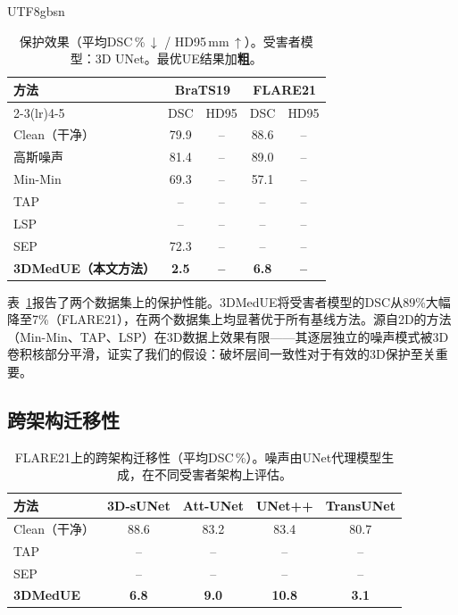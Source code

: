 \documentclass[a4paper,11pt]{article}
\begin{document}
\begin{CJK}{UTF8}{gbsn}
\begin{table}[t]
\centering
\caption{保护效果（平均DSC\,\%\,$\downarrow$ / HD95\,mm\,$\uparrow$）。受害者模型：3D UNet。最优UE结果加\textbf{粗}。}\label{tab:main}
\setlength{\tabcolsep}{4pt}
\begin{tabular}{lcccc}
\toprule
\multirow{2}{*}{方法} & \multicolumn{2}{c}{BraTS19} & \multicolumn{2}{c}{FLARE21} \\
\cmidrule(lr){2-3}\cmidrule(lr){4-5}
 & DSC & HD95 & DSC & HD95 \\
\midrule
Clean（干净）    & 79.9 & -- & 88.6 & -- \\
高斯噪声 & 81.4 & -- & 89.0 & -- \\
Min-Min~\cite{huang2021unlearnable} & 69.3 & -- & 57.1 & -- \\
TAP~\cite{fowl2021adversarial}      & -- & -- & -- & -- \\
LSP~\cite{yu2022availability}       & -- & -- & -- & -- \\
SEP~\cite{liu2023stable}            & 72.3 & -- & -- & -- \\
\midrule
\textbf{3DMedUE（本文方法）} & \textbf{2.5} & \textbf{--} & \textbf{6.8} & \textbf{--} \\
\bottomrule
\end{tabular}
\end{table}

表~\ref{tab:main}报告了两个数据集上的保护性能。3DMedUE将受害者模型的DSC从89\%大幅降至7\%（FLARE21），在两个数据集上均显著优于所有基线方法。源自2D的方法（Min-Min、TAP、LSP）在3D数据上效果有限——其逐层独立的噪声模式被3D卷积核部分平滑，证实了我们的假设：破坏层间一致性对于有效的3D保护至关重要。

\subsection{跨架构迁移性}

\begin{table}[t]
\centering
\caption{FLARE21上的跨架构迁移性（平均DSC\,\%）。噪声由UNet代理模型生成，在不同受害者架构上评估。}\label{tab:transfer}
\setlength{\tabcolsep}{6pt}
\begin{tabular}{lcccc}
\toprule
方法 & 3D-sUNet & Att-UNet & UNet++ & TransUNet \\
\midrule
Clean（干净） & 88.6 & 83.2 & 83.4 & 80.7 \\
TAP       & --   & --   & --   & -- \\
SEP       & --   & --   & --   & -- \\
\textbf{3DMedUE}  & \textbf{6.8} & \textbf{9.0} & \textbf{10.8} & \textbf{3.1} \\
\bottomrule
\end{tabular}
\end{table}


\end{CJK}
\end{document}
